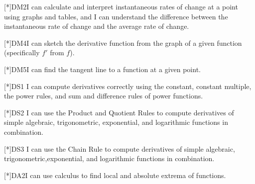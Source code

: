 [*]{DM2}{I can calculate and interpret instantaneous rates of
  change at a point using graphs and tables, and I can understand the difference
  between the instantaneous rate of change and the average rate of change.}


[*]{DM4}{I can sketch the derivative function from the graph of a
given function (specifically $f'$ from $f$).}


[*]{DM5}{I can find the tangent line to a function at a given
point.}





[*]{DS1}{%
I can compute derivatives correctly using the constant, constant multiple, the
power rules, and sum and difference rules of power functions.
}

[*]{DS2}{%
I can use the Product and Quotient Rules to compute derivatives of simple algebraic, trigonometric, exponential, and logarithmic functions in combination.
}


[*]{DS3}{%
I can use the Chain Rule to compute derivatives of simple algebraic, trigonometric,exponential, and logarithmic functions in combination.
}








[*]{DA2}{I can use calculus to find local and absolute extrema of functions.}




